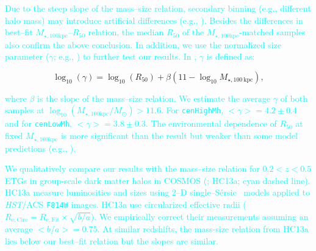 \documentclass[a4paper,fleqn,usenatbib]{mnras}
\def\ser{{S\'{e}rsic\ }}
\def\rbcg{\texttt{cenHighMh}}
\def\nbcg{\texttt{cenLowMh}}
\def\minn{{$M_{\star,10\mathrm{kpc}}$}}
\def\mtot{{$M_{\star,100\mathrm{kpc}}$}}
\def\logmtot{{$\log_{10} (M_{\star,100\mathrm{kpc}}/M_{\odot})$}}
\def\mden{{$\mu_{\star}$}}
\newcommand{\song}[1]{\textcolor{cyan}{#1}}
\begin{document}
    \song{
    Due to the steep slope of the mass--size relation, secondary binning 
    (e.g., different halo mass) may introduce artificial differences 
    (e.g., \citealt{Sonnenfeld2017}).
    Besides the differences in best--fit \mtot{}--$R_{\mathrm{50}}$ relation, the 
    median $R_{\mathrm{50}}$ of the \mtot{}-matched samples also confirm the above 
    conclusion. 
    In addition, we use the normalized size parameter ($\gamma$; e.g., 
    \citealt{Newman2012, HCompany13}) to further test our results. 
    In \citet{HCompany13}, $\gamma$ is defined as:
    }
    
    \begin{equation}
        \log_{10}(\gamma) = \log_{10} (R_{\mathrm{50}}) + \beta (11 - \log_{10}M_{\star, 100\ \mathrm{kpc}}),
    \end{equation}
    
    \song{
    where $\beta$ is the slope of the mass--size relation.
    We estimate the average $\gamma$ of both samples at \logmtot{}$>11.6$. 
    For \rbcg{}, $<\gamma> = 4.2\pm0.4$ and for \nbcg{}, 
    $<\gamma> = 3.8\pm0.3$. 
    The environmental dependence of $R_{\mathrm{50}}$ at fixed \mtot{} is more 
    significant than the \citet{HCompany13} result but weaker than some 
    model predictions (e.g., \citealt{Shankar2014}).}
    
    \song{
    We qualitatively compare our results with the mass--size relation for 
    $0.2 < z < 0.5$ ETGs in group-scale dark matter halos in COSMOS (\citealt{HueartasCompany2013b}; HC13a; cyan dashed line).
    HC13a measure luminosities and sizes using 2--D 
    single--\ser{} models applied to \textit{HST}/ACS \texttt{F814W} images. HC13a use circularized effective radii 
    ($R_{\mathrm{e,Circ}} = R_{\mathrm{e,Fit}} \times \sqrt{b/a}$). We empirically correct their measurements assuming an average $<b/a>=0.75$.
    At similar redshifts, the mass-size relation from HC13a lies below our 
    best--fit relation but the slopes are similar.
    }
    
\end{document}
